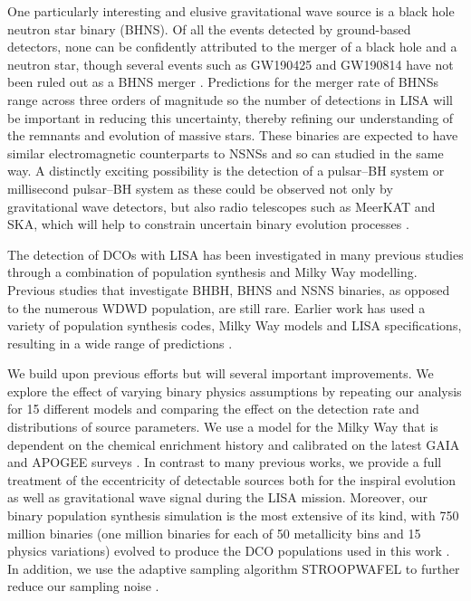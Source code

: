 One particularly interesting and elusive gravitational wave source is a black hole neutron star binary (BHNS). Of all the events detected by ground-based detectors, none can be confidently attributed to the merger of a black hole and a neutron star, though several events such as GW190425 and GW190814 have not been ruled out as a BHNS merger \citep{Abbott+2020_GW190425,Abbott+2020_GW190814}. Predictions for the merger rate of BHNSs range across three orders of magnitude \citep[e.g.][]{Broekgaarden+2021} so the number of detections in LISA will be important in reducing this uncertainty, thereby refining our understanding of the remnants and evolution of massive stars. These binaries are expected to have similar electromagnetic counterparts to NSNSs and so can studied in the same way. A distinctly exciting possibility is the detection of a pulsar--BH system or millisecond pulsar--BH system as these could be observed not only by gravitational wave detectors, but also radio telescopes such as MeerKAT and SKA, which will help to constrain uncertain binary evolution processes \citep{Chattopadhyay+2020}.

The detection of DCOs with LISA has been investigated in many previous studies through a combination of population synthesis and Milky Way modelling. Previous studies that investigate BHBH, BHNS and NSNS binaries, as opposed to the numerous WDWD population, are still rare. Earlier work has used a variety of population synthesis codes, Milky Way models and LISA specifications, resulting in a wide range of predictions \citep{Nelemans+2001,Liu+2009,Belczynski+2010,Liu+2014,Lamberts+2019,Lau+2020,Breivik+2020,Sesana+2020}.

We build upon previous efforts but will several important improvements. We explore the effect of varying binary physics assumptions by repeating our analysis for 15 different models and comparing the effect on the detection rate and distributions of source parameters. We use a model for the Milky Way that is dependent on the chemical enrichment history and calibrated on the latest GAIA and APOGEE surveys \citep{Frankel+2018}. In contrast to many previous works, we provide a full treatment of the eccentricity of detectable sources both for the inspiral evolution as well as gravitational wave signal during the LISA mission. Moreover, our binary population synthesis simulation is the most extensive of its kind, with 750 million binaries (one million binaries for each of 50 metallicity bins and 15 physics variations) evolved to produce the DCO populations used in this work \citep{Broekgaarden+2021}. In addition, we use the adaptive sampling algorithm STROOPWAFEL to further reduce our sampling noise \citep{Broekgaarden+2019}.

